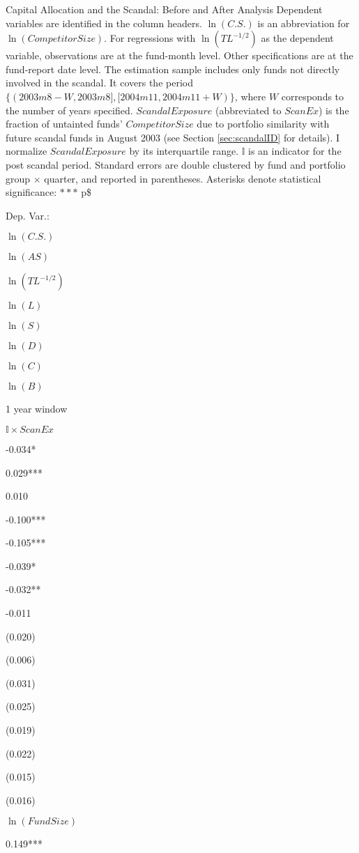 \documentclass[]{book}
\theoremstyle{definition}
\theoremstyle{definition}
\theoremstyle{definition}
\theoremstyle{remark}
\begin{document}
\label{tab:scandalSpillover}Capital Allocation and the Scandal: Before and
After Analysis Dependent variables are identified in the column headers.
\(\ln(C.S.)\) is an abbreviation for \(\ln(CompetitorSize)\). For
regressions with \(\ln(TL^{-1/2})\) as the dependent variable,
observations are at the fund-month level. Other specifications are at
the fund-report date level. The estimation sample includes only funds
not directly involved in the scandal. It covers the period
\(\{(2003m8-W, 2003m8], [2004m11, 2004m11 + W) \}\), where \(W\)
corresponds to the number of years specified. \(ScandalExposure\)
(abbreviated to \(ScanEx\)) is the fraction of untainted funds'
\(CompetitorSize\) due to portfolio similarity with future scandal funds
in August 2003 (see Section \ref{sec:scandalID} for details). I
normalize \(ScandalExposure\) by its interquartile range. \(\mathbb{I}\)
is an indicator for the post scandal period. Standard errors are double
clustered by fund and portfolio group \(\times\) quarter, and reported
in parentheses. Asterisks denote statistical significance:
\(\ast\ast\ast\) p\$

Dep. Var.:

\(\ln(C.S.)\)

\(\ln(AS)\)

\(\ln(TL^{-1/2})\)

\(\ln(L)\)

\(\ln(S)\)

\(\ln(D)\)

\(\ln(C)\)

\(\ln(B)\)

1 year window

\(\mathbb{I}\times ScanEx\)

-0.034*

0.029***

0.010

-0.100***

-0.105***

-0.039*

-0.032**

-0.011

(0.020)

(0.006)

(0.031)

(0.025)

(0.019)

(0.022)

(0.015)

(0.016)

\(\ln(FundSize)\)

0.149***
\end{document}
